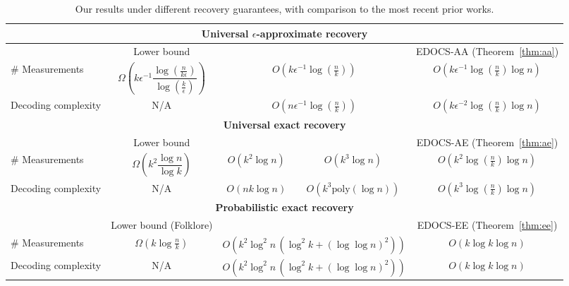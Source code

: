 \documentclass{article}
\begin{document}
% 
\begin{table}[H]
\centering
\setlength{\tabcolsep}{2pt}
\small
\begin{tabular}{@{}lcccc@{}}
\toprule

\multicolumn{5}{c}{\textbf{Universal $\epsilon$-approximate recovery}}\\
\midrule
& Lower bound \cite{matsumoto2023improved}
& \multicolumn{2}{c}{\cite{matsumoto2023improved}}
& EDOCS-AA (Theorem~\ref{thm:aa})\\
\midrule
\# Measurements
& $\Omega\left(k\epsilon^{-1}\dfrac{\log(\frac{n}{k\epsilon})}{\log(\frac{k}{\epsilon})}\right)$
& \multicolumn{2}{c}{$O(k\epsilon^{-1}\log(\frac{n}{k}))$}
& $O(k\epsilon^{-1}\log(\frac{n}{k})\log n)$\\
Decoding complexity
& N/A
& \multicolumn{2}{c}{$O(n\epsilon^{-1}\log(\frac{n}{k}))$}
& $O(k\epsilon^{-2}\log(\frac{n}{k})\log n)$\\

\midrule
\multicolumn{5}{c}{\textbf{Universal exact recovery}}\\
\midrule
& Lower bound \cite{acharya2017improved}
& \cite{acharya2017improved}
& \cite{nakos2017fast}
& EDOCS-AE (Theorem~\ref{thm:ae})\\
\midrule
\# Measurements
& $\Omega\left(k^2\dfrac{\log n}{\log k}\right)$
& $O(k^2\log n)$
& $O(k^3\log n)$
& $O(k^2\log(\frac{n}{k})\log n)$\\
Decoding complexity
& N/A
& $O(nk\log n)$
& $O(k^3\mathrm{poly}(\log n))$
& $O(k^3\log(\frac{n}{k})\log n)$\\

\midrule
\multicolumn{5}{c}{\textbf{Probabilistic exact recovery}}\\
\midrule
& Lower bound (Folklore)
& \multicolumn{2}{c}{\cite{yang2025sublinear}}
& EDOCS-EE (Theorem~\ref{thm:ee})\\
\midrule
\# Measurements
& $\Omega\left(k\log \frac{n}{k}\right)$
& \multicolumn{2}{c}{$O(k^2\log^2 n\,(\log^2 k+(\log\log n)^2))$}
& $O(k\log k\log n)$\\
Decoding complexity
& N/A
& \multicolumn{2}{c}{$O(k^2\log^2 n\,(\log^2 k+(\log\log n)^2))$}
& $O(k\log k\log n)$\\

\bottomrule
\end{tabular}

\vspace{4pt}

\caption{Our results under different recovery guarantees, with comparison to the most recent prior works.}
\label{tab:comparison}
\end{table}
\end{document}
